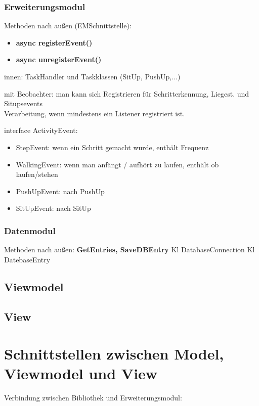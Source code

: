 \documentclass[a4paper,12pt]{article}
\begin{document}
\subsubsection{Erweiterungsmodul}
Methoden nach außen (EMSchnittstelle):
\begin{itemize}
    \item \textbf{async registerEvent()}
    \item \textbf{async unregisterEvent()}
\end{itemize}
innen: TaskHandler und Taskklassen (SitUp, PushUp,...)

mit Beobachter: man kann sich Registrieren für Schritterkennung, Liegest. und Situpsevents\\
Verarbeitung, wenn mindestens ein Listener registriert ist. 

interface ActivityEvent: 
\begin{itemize}
    \item StepEvent: wenn ein Schritt gemacht wurde, enthält Frequenz
    \item WalkingEvent: wenn man anfängt / aufhört zu laufen, enthält ob laufen/stehen 
    \item PushUpEvent: nach PushUp
    \item SitUpEvent: nach SitUp
\end{itemize}

\subsubsection{Datenmodul}
Methoden nach außen: \textbf{GetEntries, SaveDBEntry}
Kl DatabaseConnection
Kl DatebaseEntry
 
\subsection{Viewmodel}

\subsection{View}


\section{Schnittstellen zwischen Model, Viewmodel und View}
Verbindung zwischen Bibliothek und Erweiterungsmodul:
\end{document}
